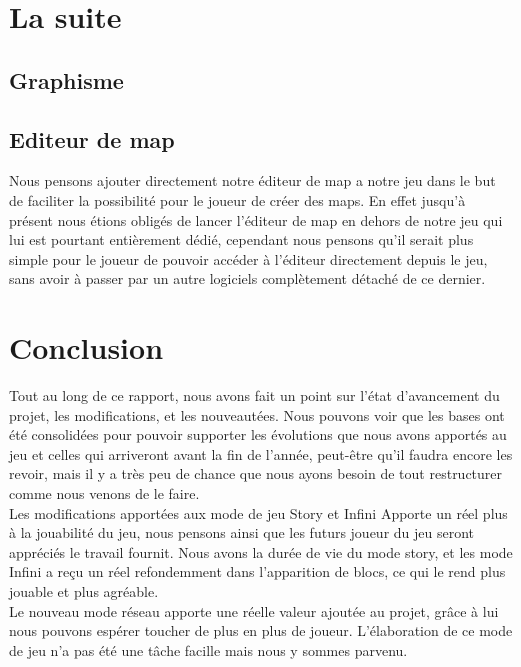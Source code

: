 \documentclass [11pt]{report}
\begin{document}
	
	
	
\chapter{La suite}
	\section{Graphisme}
	\section{Editeur de map}
		Nous pensons ajouter directement notre éditeur de map a notre jeu dans le but de faciliter la possibilité pour le joueur de créer des maps. En effet jusqu'à présent nous étions obligés de lancer l'éditeur de map en dehors de notre jeu qui lui est pourtant entièrement dédié, cependant nous pensons qu'il serait plus simple pour le joueur de pouvoir accéder à l'éditeur directement depuis le jeu, sans avoir à passer par un autre logiciels complètement détaché de ce dernier. 
		
		
		
\chapter*{Conclusion}
	Tout au long de ce rapport, nous avons fait un point sur l'\'etat d'avancement du projet, les modifications, et les nouveaut\'ees. Nous pouvons voir que les bases ont \'et\'e consolid\'ees pour pouvoir supporter les \'evolutions que nous avons apport\'es au jeu et celles qui arriveront avant la fin de l'ann\'ee, peut-\^etre qu'il faudra encore les revoir, mais il y a tr\`es peu de chance que nous ayons besoin de tout restructurer comme nous venons de le faire. \\
	
	Les modifications apport\'ees aux mode de jeu Story et Infini Apporte un r\'eel plus \`a la jouabilit\'e du jeu, nous pensons ainsi que les futurs joueur du jeu seront appr\'eci\'es le travail fournit. Nous avons la dur\'ee de vie du mode story, et les mode Infini a reçu un r\'eel refondemment dans l'apparition de blocs, ce qui le rend plus jouable et plus agr\'eable.\\
	
	Le nouveau mode r\'eseau apporte une r\'eelle valeur ajout\'ee au projet, gr\^ace \`a lui nous pouvons esp\'erer toucher de plus en plus de joueur. L'\'elaboration de ce mode de jeu n'a pas \'et\'e une t\^ache facille mais nous y sommes parvenu.\\
	
\end{document}
